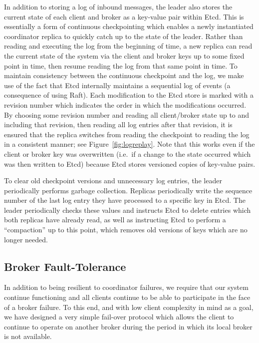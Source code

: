 In addition to storing a log of inbound messages, the leader also stores the current state of each client and broker as a key-value pair within Etcd.
This is essentially a form of continuous checkpointing which enables a newly instantiated coordinator replica to quickly catch up to the state of the leader.
Rather than reading and executing the log from the beginning of time, a new replica can read the current state of the system via the client and broker keys up to some fixed point in time, then resume reading the log from that same point in time.
To maintain consistency between the continuous checkpoint and the log, we make use of the fact that Etcd internally maintains a sequential log of events (a consequence of using Raft).
Each modification to the Etcd store is marked with a revision number which indicates the order in which the modifications occurred.
By choosing some revision number and reading all client/broker state up to and including that revision, then reading all log entries after that revision, it is ensured that the replica switches from reading the checkpoint to reading the log in a consistent manner; see Figure~\ref{fig:logreplay}.
Note that this works even if the client or broker key was overwritten (i.e.\ if a change to the state occurred which was then written to Etcd) because Etcd stores versioned copies of key-value pairs.

To clear old checkpoint versions and unnecessary log entries, the leader periodically performs garbage collection.
Replicas periodically write the sequence number of the last log entry they have processed to a specific key in Etcd.
The leader periodically checks these values and instructs Etcd to delete entries which both replicas have already read, as well as instructing Etcd to perform a ``compaction'' up to this point, which removes old versions of keys which are no longer needed.

\subsection{Broker Fault-Tolerance}

In addition to being resilient to coordinator failures, we require that our system continue functioning and all clients continue to be able to participate in the face of a broker failure.
To this end, and with low client complexity in mind as a goal, we have designed a very simple fail-over protocol which allows the client to continue to operate on another broker during the period in which its local broker is not available.

